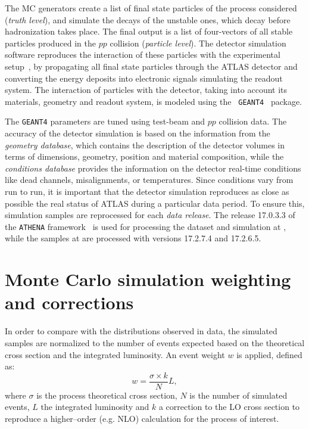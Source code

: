 The MC generators create a list of final state particles of the
process considered ({\it truth level}), and simulate the decays of the
unstable ones, which decay before hadronization takes place. 
The final output is a list of four-vectors of all stable
particles produced in the $pp$ collision ({\it particle level}). 
The detector simulation software reproduces the interaction of these
particles with the experimental setup~\cite{atlas_sim}, by propagating
all final state particles through the ATLAS detector and converting
the energy deposits into electronic signals simulating the readout
system. 
The interaction of particles with the detector, taking into account
its materials, geometry and readout system, is modeled using the {\tt
  GEANT4}~\cite{geant} package.

The \texttt{GEANT4} parameters are tuned using test-beam and $pp$
collision data. The accuracy of the detector simulation is based on
the information from the {\it geometry database}, which contains the
description of the detector volumes in terms of dimensions, geometry,
position and material composition, while the {\it conditions database}
provides the information on the detector real-time conditions like
dead channels, misalignments, or temperatures. Since conditions vary
from run to run, it is important that the detector simulation
reproduces as close as possible the real status of ATLAS during a
particular data period. To ensure this, simulation samples are
reprocessed for each {\it data release}. 
The release 17.0.3.3 of the \texttt{ATHENA}
framework~\cite{Calafiura:865624} is used for processing the dataset
and simulation at \seventev{}, while the samples at \eighttev{} are
processed with versions 17.2.7.4 and 17.2.6.5.

\section{Monte Carlo simulation weighting and corrections}
\label{sec:mcweights}

In order to compare with the distributions observed in data, the
simulated samples are normalized to the number of events expected
based on the theoretical cross section and the integrated luminosity.
An event weight $w$ is applied, defined as:
\begin{equation}\label{eq:mcweight}
w = \dfrac{\sigma\times k}{N} L,
\end{equation}
where $\sigma$ is the process theoretical cross section, $N$ is the
number of simulated events, $L$ the integrated luminosity and $k$ a
correction to the LO cross section to reproduce a higher--order
(e.g. NLO) calculation for the process of interest.

